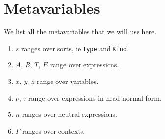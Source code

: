 \documentclass{article}
\begin{document}
\begin{comment}
Noting that lines beginning with \verb|--| are treated as comments and 
using syntactic sugar borrowed from the Lean theorem prover, we may rewrite this
as
\begin{verbatim}
theorem or_comm :
forall (P : Prop) (Q : Prop), (P \/ Q) -> Q \/ P :=
-- Assume that P and Q are propositions and that p_or_q 
-- is a proof that P \/ Q.
  assume P Q (p_or_q : P \/ Q),
    -- We proceed by considering cases on P \/ Q.
    match p_or_q with
    -- In the event where P is true, ie p is a proof of P,
    -- we may immediate conclude Q \/ P is true since 
    -- (inr p) is a proof of it.
    | inl p => show Q \/ P, from inr p
    -- In the event where Q is true, ie q is a proof of Q,
    -- we use (inl q) to show Q \/ P. 
    | inr q => show Q \/ P, from inl q
    end
\end{verbatim}
which may read more naturally to those who are more mathematically inclined.
\end{comment}




\section{Metavariables}
We list all the metavariables that we will use here.

\begin{enumerate}
  \item $s$ ranges over sorts, ie \texttt{Type} and \texttt{Kind}. 
  \item $A$, $B$, $T$, $E$ range over expressions. 
  \item $x$, $y$, $z$ range over variables.
  \item $\nu, \, \tau$ range over expressions in head normal form.
  \item $n$ ranges over neutral expressions.
  \item $\Gamma$ ranges over contexts.
\end{enumerate}
\end{document}
